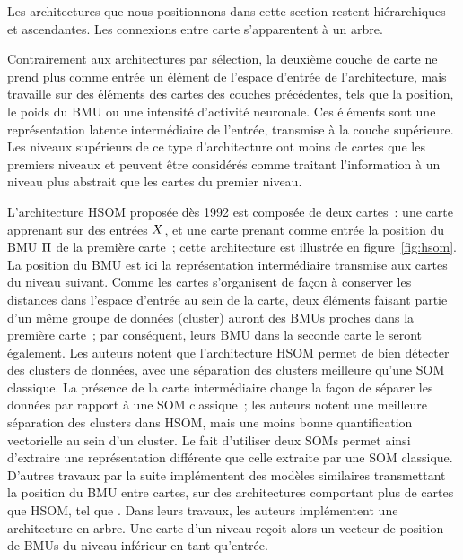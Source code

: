 \documentclass[../main]{subfiles}
\begin{document}
Les architectures que nous positionnons dans cette section restent hiérarchiques et ascendantes. Les connexions entre carte s'apparentent à un arbre.

Contrairement aux architectures par sélection, la deuxième couche de carte ne prend plus comme entrée un élément de l'espace d'entrée de l'architecture, mais travaille sur des éléments des cartes des couches précédentes, tels que la position, le poids du BMU ou une intensité d'activité neuronale. 
Ces éléments sont une représentation latente intermédiaire de l'entrée, transmise à la couche supérieure. Les niveaux supérieurs de ce type d'architecture ont moins de cartes que les premiers niveaux et peuvent être considérés comme traitant l'information à un niveau plus abstrait que les cartes du premier niveau.


L'architecture  HSOM \cite{lampinen_clustering_1992} proposée dès 1992 est composée de deux cartes~: une carte apprenant sur des entrées $X$, et une carte prenant comme entrée la position du BMU $\Pi$ de la première carte~; cette architecture est illustrée en figure~\ref{fig:hsom}. 
La position du BMU est ici la représentation intermédiaire transmise aux cartes du niveau suivant.
Comme les cartes s'organisent de façon à conserver les distances dans l'espace d'entrée au sein de la carte, deux éléments faisant partie d'un même groupe de données (cluster) auront des BMUs proches dans la première carte~; par conséquent, leurs BMU dans la seconde carte le seront également. 
Les auteurs notent que l'architecture HSOM permet de bien détecter des clusters de données, avec une séparation des clusters meilleure qu'une SOM classique.
La présence de la carte intermédiaire change la façon de séparer les données par rapport à une SOM classique~; les auteurs notent une meilleure séparation des clusters dans HSOM, mais une moins bonne quantification vectorielle au sein d'un cluster. Le fait d'utiliser deux SOMs permet ainsi d'extraire une représentation différente que celle extraite par une SOM classique.
D'autres travaux par la suite implémentent des modèles similaires transmettant la position du BMU entre cartes, sur des architectures comportant plus de cartes que HSOM, tel que \cite{hagenauer_hierarchical_2013}. Dans leurs travaux, les auteurs implémentent une architecture en arbre. Une carte d'un niveau reçoit alors un vecteur de position de BMUs du niveau inférieur en tant qu'entrée.
\end{document}
